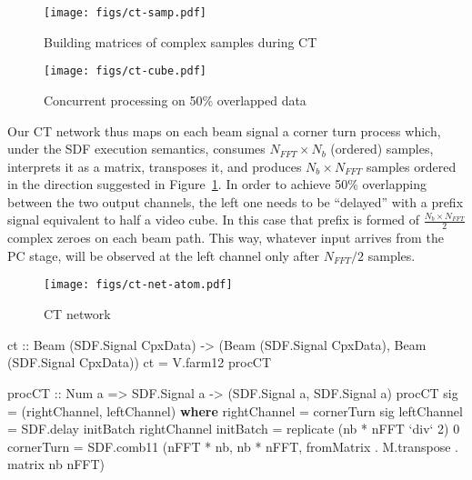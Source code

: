 \documentclass[
  a4paper,
]{article}
\newenvironment{Shaded}{}{}
\newcommand{\DataTypeTok}[1]{\textcolor[rgb]{0.56,0.13,0.00}{#1}}
\newcommand{\DecValTok}[1]{\textcolor[rgb]{0.25,0.63,0.44}{#1}}
\newcommand{\FunctionTok}[1]{\textcolor[rgb]{0.02,0.16,0.49}{#1}}
\newcommand{\KeywordTok}[1]{\textcolor[rgb]{0.00,0.44,0.13}{\textbf{#1}}}
\newcommand{\NormalTok}[1]{#1}
\newcommand{\OtherTok}[1]{\textcolor[rgb]{0.00,0.44,0.13}{#1}}
\begin{document}
\begin{figure}
\hypertarget{fig:ct-samp}{%
\centering
\texttt{[image: figs/ct-samp.pdf]}
\caption{Building matrices of complex samples during
CT}\label{fig:ct-samp}
}
\end{figure}

\begin{figure}
\hypertarget{fig:ct-cube}{%
\centering
\texttt{[image: figs/ct-cube.pdf]}
\caption{Concurrent processing on 50\% overlapped
data}\label{fig:ct-cube}
}
\end{figure}

Our CT network thus maps on each beam signal a corner turn process
which, under the SDF execution semantics, consumes \(N_{FFT}\times N_b\)
(ordered) samples, interprets it as a matrix, transposes it, and
produces \(N_b\times N_{FFT}\) samples ordered in the direction
suggested in Figure~\ref{fig:ct-samp}. In order to achieve 50\%
overlapping between the two output channels, the left one needs to be
``delayed'' with a prefix signal equivalent to half a video cube. In
this case that prefix is formed of \(\frac{N_b \times N_{FFT}}{2}\)
complex zeroes on each beam path. This way, whatever input arrives from
the PC stage, will be observed at the left channel only after
\(N_{FFT}/2\) samples.

\begin{figure}
\hypertarget{fig:ct-net-atom}{%
\centering
\texttt{[image: figs/ct-net-atom.pdf]}
\caption{CT network}\label{fig:ct-net-atom}
}
\end{figure}

\begin{Shaded}
\begin{Highlighting}[numbers=left,,firstnumber=269,]
\OtherTok{ct ::} \DataTypeTok{Beam}\NormalTok{ (}\DataTypeTok{SDF.Signal} \DataTypeTok{CpxData}\NormalTok{)}
   \OtherTok{->}\NormalTok{ (}\DataTypeTok{Beam}\NormalTok{ (}\DataTypeTok{SDF.Signal} \DataTypeTok{CpxData}\NormalTok{),}
       \DataTypeTok{Beam}\NormalTok{ (}\DataTypeTok{SDF.Signal} \DataTypeTok{CpxData}\NormalTok{))}
\NormalTok{ct }\FunctionTok{=}\NormalTok{ V.farm12 procCT}

\OtherTok{procCT ::} \DataTypeTok{Num}\NormalTok{ a }\OtherTok{=>} \DataTypeTok{SDF.Signal}\NormalTok{ a }\OtherTok{->}\NormalTok{ (}\DataTypeTok{SDF.Signal}\NormalTok{ a, }\DataTypeTok{SDF.Signal}\NormalTok{ a)}
\NormalTok{procCT sig }\FunctionTok{=}\NormalTok{ (rightChannel, leftChannel)}
  \KeywordTok{where}
\NormalTok{    rightChannel }\FunctionTok{=}\NormalTok{ cornerTurn sig}
\NormalTok{    leftChannel  }\FunctionTok{=}\NormalTok{ SDF.delay initBatch rightChannel}
\NormalTok{    initBatch    }\FunctionTok{=} \FunctionTok{replicate}\NormalTok{ (nb }\FunctionTok{*}\NormalTok{ nFFT }\OtherTok{`div`} \DecValTok{2}\NormalTok{) }\DecValTok{0}
\NormalTok{    cornerTurn   }\FunctionTok{=}\NormalTok{ SDF.comb11 (nFFT }\FunctionTok{*}\NormalTok{ nb, nb }\FunctionTok{*}\NormalTok{ nFFT,}
\NormalTok{                               fromMatrix }\FunctionTok{.}\NormalTok{ M.transpose }\FunctionTok{.}\NormalTok{ matrix nb nFFT)}
\end{Highlighting}
\end{Shaded}
\end{document}
